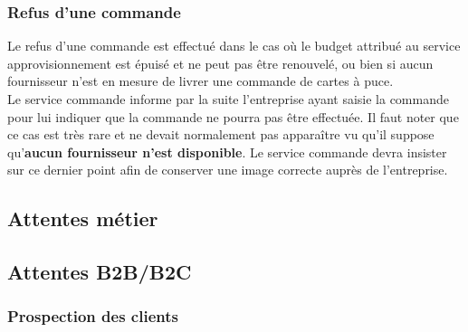 \subsubsection{Refus d'une commande}

Le refus d'une commande est effectué dans le cas où le budget attribué au
service approvisionnement est épuisé et ne peut pas être renouvelé, ou bien si
aucun fournisseur n'est en mesure de livrer une commande de cartes à puce. \\

Le service commande informe par la suite l'entreprise ayant saisie la commande
pour lui indiquer que la commande ne pourra pas être effectuée. Il faut noter
que ce cas est très rare et ne devait normalement pas apparaître vu qu'il
suppose qu'\textbf{aucun fournisseur n'est disponible}. Le service commande
devra insister sur ce dernier point afin de conserver une image correcte auprès
de l'entreprise.

\subsection{Attentes métier}
\subsection{Attentes B2B/B2C}

\subsubsection{Prospection des clients}

